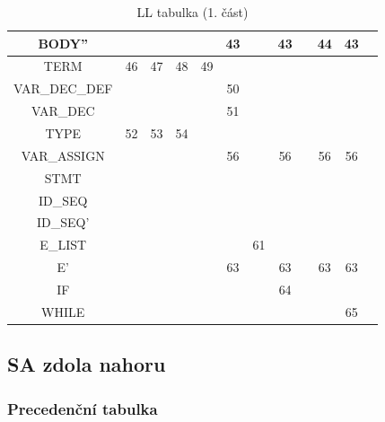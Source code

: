 \documentclass[11pt,a4paper]{article}
\begin{document}
\begin{table}
\begin{tabular}{|c|c|c|c|c|c|l|c|c|c|c|c|}
        BODY'' &  &  &  &  & 43 &  & 43 &  & 44 & 43 &  \\ \hline
        TERM & 46 & 47 & 48 & 49 &  &  &  &  &  &  &  \\ \hline
        VAR\_DEC\_DEF &  &  &  &  & 50 &  &  &  &  &  &  \\ \hline
        VAR\_DEC &  &  &  &  & 51 &  &  &  &  &  &  \\ \hline
        TYPE & 52 & 53 & 54 &  &  &  &  &  &  &  &  \\ \hline
        VAR\_ASSIGN &  &  &  &  & 56 &  & 56 &  & 56 & 56 &  \\ \hline
        STMT &  &  &  &  &  &  &  &  &  &  &  \\ \hline
        ID\_SEQ &  &  &  &  &  &  &  &  &  &  &  \\ \hline
        ID\_SEQ' &  &  &  &  &  &  &  &  &  &  &  \\ \hline
        E\_LIST &  &  &  &  &  & 61 &  &  &  &  &  \\ \hline
        E' &  &  &  &  & 63 &  & 63 &  & 63 & 63 &  \\ \hline
        IF &  &  &  &  &  &  & 64 &  &  &  &  \\ \hline
        WHILE &  &  &  &  &  &  &  &  &  & 65 &  \\ \hline
        \end{tabular}
        \caption{LL tabulka (1. část)}
    \end{table}
        
        \subsection{SA zdola nahoru}
        \subsubsection{Precedenční tabulka}
        
\end{document}
